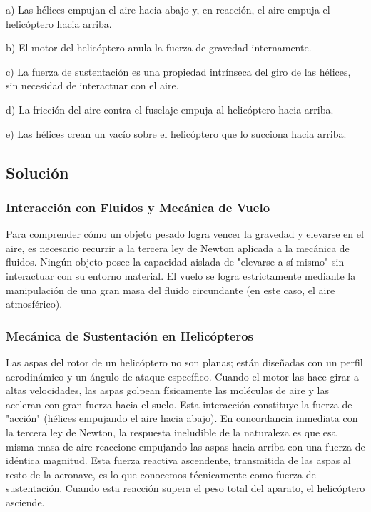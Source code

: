 \documentclass[12pt]{article}
\begin{document}
a) Las hélices empujan el aire hacia abajo y, en reacción, el aire empuja el helicóptero hacia arriba.

b) El motor del helicóptero anula la fuerza de gravedad internamente.

c) La fuerza de sustentación es una propiedad intrínseca del giro de las hélices, sin necesidad de interactuar con el aire.

d) La fricción del aire contra el fuselaje empuja al helicóptero hacia arriba.

e) Las hélices crean un vacío sobre el helicóptero que lo succiona hacia arriba.

\subsection*{Solución}

\subsubsection*{Interacción con Fluidos y Mecánica de Vuelo}
Para comprender cómo un objeto pesado logra vencer la gravedad y elevarse en el aire, es necesario recurrir a la tercera ley de Newton aplicada a la mecánica de fluidos. Ningún objeto posee la capacidad aislada de "elevarse a sí mismo" sin interactuar con su entorno material. El vuelo se logra estrictamente mediante la manipulación de una gran masa del fluido circundante (en este caso, el aire atmosférico).

\subsubsection*{Mecánica de Sustentación en Helicópteros}
Las aspas del rotor de un helicóptero no son planas; están diseñadas con un perfil aerodinámico y un ángulo de ataque específico. Cuando el motor las hace girar a altas velocidades, las aspas golpean físicamente las moléculas de aire y las aceleran con gran fuerza hacia el suelo. Esta interacción constituye la fuerza de "acción" (hélices empujando el aire hacia abajo).
En concordancia inmediata con la tercera ley de Newton, la respuesta ineludible de la naturaleza es que esa misma masa de aire reaccione empujando las aspas hacia arriba con una fuerza de idéntica magnitud. Esta fuerza reactiva ascendente, transmitida de las aspas al resto de la aeronave, es lo que conocemos técnicamente como fuerza de sustentación. Cuando esta reacción supera el peso total del aparato, el helicóptero asciende.
\end{document}
